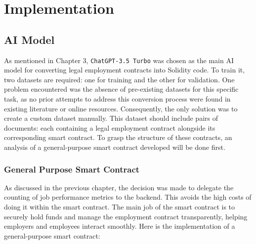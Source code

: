 \chapter{Implementation}

\section{AI Model}

As mentioned in Chapter 3, \texttt{ChatGPT-3.5 Turbo} was chosen as the main AI model for converting legal employment contracts into Solidity code. To train it, two datasets are required: one for training and the other for validation. One problem encountered was the absence of pre-existing datasets for this specific task, as no prior attempts to address this conversion process were found in existing literature or online resources. Consequently, the only solution was to create a custom dataset manually. This dataset should include pairs of documents:  each containing a legal employment contract alongside its corresponding smart contract. To grasp the structure of these contracts, an analysis of a general-purpose smart contract developed will be done first. %

\subsection{General Purpose Smart Contract}

As discussed in the previous chapter, the decision was made to delegate the counting of job performance metrics to the backend. This avoids the high costs of doing it within the smart contract. The main job of the smart contract is to securely hold funds and manage the employment contract transparently, helping employers and employees interact smoothly. Here is the implementation of a general-purpose smart contract:


